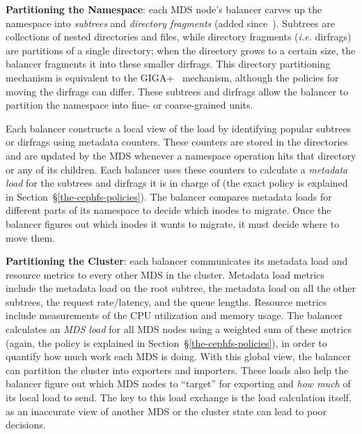 \textbf{Partitioning the Namespace}: each MDS node's balancer carves up the namespace into {\it subtrees} and {\it directory fragments} (added since~\cite{weil:sc2004-dyn-metadata,weil:osdi2006-ceph}). Subtrees are collections of nested directories and files, while directory fragments ({\it i.e.} dirfrags) are partitions of a single directory; when the directory grows to a certain size, the balancer fragments it into these smaller dirfrags. This directory partitioning mechanism is equivalent to the GIGA+~\cite{patil:fast2011-giga+} mechanism, although the policies for moving the dirfrags can differ.  These subtrees and dirfrags allow the balancer to  partition the namespace into fine- or coarse-grained units.

Each balancer constructs a local view of the load by identifying popular subtrees or dirfrags using metadata counters. These counters are stored in the directories and are updated by the MDS whenever a namespace operation hits that directory or any of its children. Each balancer uses these counters to calculate a {\it metadata load} for the subtrees and dirfrags it is in charge of (the exact policy is explained in Section~\S\ref{the-cephfs-policies}). The balancer compares metadata loads for different parts of its namespace to decide which inodes to migrate. Once the balancer figures out which inodes it wants to migrate, it must decide where to move them.

\textbf{Partitioning the Cluster}: each balancer communicates its metadata load and resource metrics to every other MDS in the cluster. Metadata load metrics include the metadata load on the root subtree, the metadata load on all the other subtrees, the request rate/latency, and the queue lengths. Resource metrics include measurements of the CPU utilization and memory usage. The balancer calculates an {\it MDS load} for all MDS nodes using a weighted sum of these metrics (again, the policy is explained in Section~\S\ref{the-cephfs-policies}), in order to quantify how much work each MDS is doing. With this global view, the balancer can partition the cluster into exporters and importers. These loads also help the balancer figure out which MDS nodes to ``target'' for exporting and {\it how much} of its local load to send. The key to this load exchange is the load calculation itself, as an inaccurate view of another MDS or the cluster state can lead to poor decisions.

